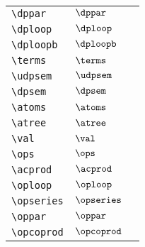 \begin{longtable}{lll}
  {\color[rgb]{0.5,0.5,0.5}\texttt{\textbackslash dppar}}                                                   & $\dppar$                   & \\
  {\color[rgb]{0.5,0.5,0.5}\texttt{\textbackslash dploop}}                                                  & $\dploop$                  & \\
  {\color[rgb]{0.5,0.5,0.5}\texttt{\textbackslash dploopb}}                                                 & $\dploopb$                 & \\
  {\color[rgb]{0.5,0.5,0.5}\texttt{\textbackslash terms}}                                                   & $\terms$                   & \\
  {\color[rgb]{0.5,0.5,0.5}\texttt{\textbackslash udpsem}}                                                  & $\udpsem$                  & \\
  {\color[rgb]{0.5,0.5,0.5}\texttt{\textbackslash dpsem}}                                                   & $\dpsem$                   & \\
  {\color[rgb]{0.5,0.5,0.5}\texttt{\textbackslash atoms}}                                                   & $\atoms$                   & \\
  {\color[rgb]{0.5,0.5,0.5}\texttt{\textbackslash atree}}                                                   & $\atree$                   & \\
  {\color[rgb]{0.5,0.5,0.5}\texttt{\textbackslash val}}                                                     & $\val$                     & \\
  {\color[rgb]{0.5,0.5,0.5}\texttt{\textbackslash ops}}                                                     & $\ops$                     & \\
  {\color[rgb]{0.5,0.5,0.5}\texttt{\textbackslash acprod}}                                                  & $\acprod$                  & \\
  {\color[rgb]{0.5,0.5,0.5}\texttt{\textbackslash oploop}}                                                  & $\oploop$                  & \\
  {\color[rgb]{0.5,0.5,0.5}\texttt{\textbackslash opseries}}                                                & $\opseries$                & \\
  {\color[rgb]{0.5,0.5,0.5}\texttt{\textbackslash oppar}}                                                   & $\oppar$                   & \\
  {\color[rgb]{0.5,0.5,0.5}\texttt{\textbackslash opcoprod}}                                                & $\opcoprod$                & \\

\end{longtable}
